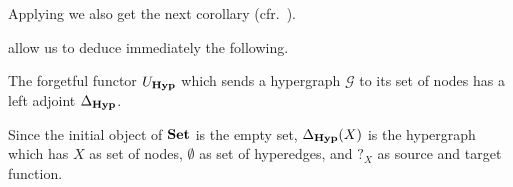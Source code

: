 \documentclass[a4paper,UKenglish,cleveref,pdftex,thm-restate,numberwithinsect]{lipics-v2021}
\newcommand{\catname}[1]{\textbf{\textup{#1}}}
\newcommand{\hyp}{\catname{Hyp}}
\begin{document}
Applying  we also get the next corollary (cfr.~\cite[Fact 4.17]{ehrig2006fundamentals}).


{\color{red} } allow us to deduce immediately the following.

\begin{proposition}\label{cor:left}  The forgetful functor $U_{\hyp}$ which sends a hypergraph $\mathcal{G}$ to its set of nodes has a left adjoint $\Delta_{\hyp}$.
\end{proposition}

\begin{example}Since the initial object of $\catname{Set}$ is the empty set,  $\Delta_{\hyp}(X)$ is the hypergraph which has $X$ as set of nodes, $\emptyset$ as set of hyperedges, and $?_X$ as source and target function.
\end{example}

\end{document}
